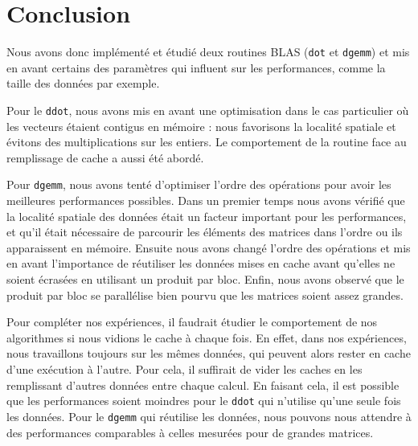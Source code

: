 \section*{Conclusion}

Nous avons donc implémenté et étudié deux routines BLAS (\texttt{dot} et \texttt{dgemm}) et mis en avant certains des paramètres qui influent sur les performances, comme la taille des données par exemple.

Pour le \texttt{ddot}, nous avons mis en avant une optimisation dans le cas particulier où les vecteurs étaient contigus en mémoire : nous favorisons la localité spatiale et évitons des multiplications sur les entiers. Le comportement de la routine face au remplissage de cache a aussi été abordé.

Pour \texttt{dgemm}, nous avons tenté d'optimiser l'ordre des opérations pour avoir les meilleures performances possibles. Dans un premier temps nous avons vérifié que la localité spatiale des données était un facteur important pour les performances, et qu'il était nécessaire de parcourir les éléments des matrices dans l'ordre ou ils apparaissent en mémoire. Ensuite nous avons changé l'ordre des opérations et mis en avant l'importance de réutiliser les données mises en cache avant qu'elles ne soient écrasées en utilisant un produit par bloc. Enfin, nous avons observé que le produit par bloc se parallélise bien pourvu que les matrices soient assez grandes.

Pour compléter nos expériences, il faudrait étudier le comportement de nos algorithmes si nous vidions le cache à chaque fois. En effet, dans nos expériences, nous travaillons toujours sur les mêmes données, qui peuvent alors rester en cache d'une exécution à l'autre. Pour cela, il suffirait de vider les caches en les remplissant d'autres données entre chaque calcul. En faisant cela, il est possible que les performances soient moindres pour le \texttt{ddot} qui n'utilise qu'une seule fois les données. Pour le \texttt{dgemm} qui réutilise les données, nous pouvons nous attendre à des performances comparables à celles mesurées pour de grandes matrices.